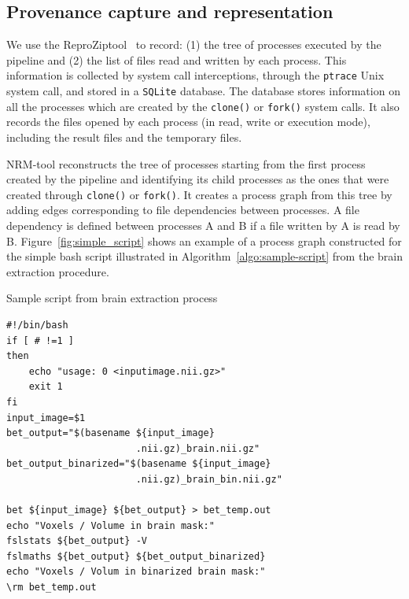 \documentclass[a4paper,num-refs]{oup-contemporary}
\newcommand{\reprozip}[0]{ReproZip}
\begin{document}
\subsection{Provenance capture and representation}

We use the \reprozip tool~\cite{Chirigati2016} to record: (1) 
the tree of processes executed by the pipeline and (2) the list of 
files read and written by each process. This information is collected 
by system call interceptions, through the \texttt{ptrace} Unix system 
call, and stored in a \texttt{SQLite} database. The database stores 
information on all the processes which are created by the 
\texttt{clone()} or \texttt{fork()} system calls. It also records the 
files opened by each process (in read, write or execution mode), 
including the result files and the temporary files.

NRM-tool reconstructs the tree of processes starting from the first process 
created by the pipeline and identifying its child processes as the ones 
that were created through \texttt{clone()} or \texttt{fork()}. It 
creates a process graph from this tree by adding edges corresponding to 
file dependencies between processes. A file dependency is defined 
between processes A and B if a file written by A is read by B. 
Figure~\ref{fig:simple_script} shows an example of a process graph 
constructed for the simple bash script illustrated in 
Algorithm~\ref{algo:sample-script} from the brain extraction procedure.


\begin{algorithm}[h!]
\caption{Sample script from brain extraction process}
\label{algo:sample-script}
\begin{verbatim}
#!/bin/bash
if [ # !=1 ]
then
    echo "usage: 0 <inputimage.nii.gz>"
    exit 1
fi
input_image=$1
bet_output="$(basename ${input_image} 
                       .nii.gz)_brain.nii.gz"
bet_output_binarized="$(basename ${input_image} 
                       .nii.gz)_brain_bin.nii.gz"

bet ${input_image} ${bet_output} > bet_temp.out
echo "Voxels / Volume in brain mask:"
fslstats ${bet_output} -V
fslmaths ${bet_output} ${bet_output_binarized}
echo "Voxels / Volum in binarized brain mask:"
\rm bet_temp.out
\end{verbatim}
\end{algorithm}
\end{document}
